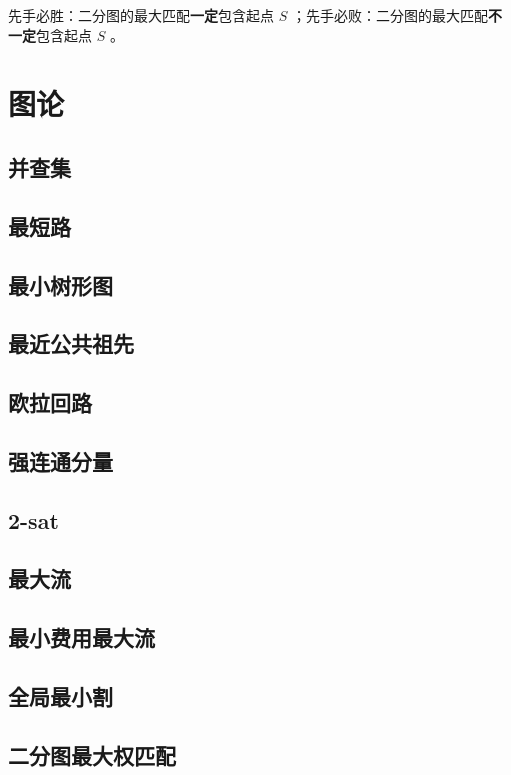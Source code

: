 \documentclass{article}
\begin{document}
先手必胜：二分图的最大匹配\textbf{一定}包含起点 $S$ ；先手必败：二分图的最大匹配\textbf{不一定}包含起点 $S$ 。

\section{图论}
\subsection{并查集}

\subsection{最短路}

\subsection{最小树形图}

\subsection{最近公共祖先}

\subsection{欧拉回路}

\subsection{强连通分量}

\subsection{2-sat}

\subsection{最大流}

\subsection{最小费用最大流}

\subsection{全局最小割}

\subsection{二分图最大权匹配}

\end{document}
